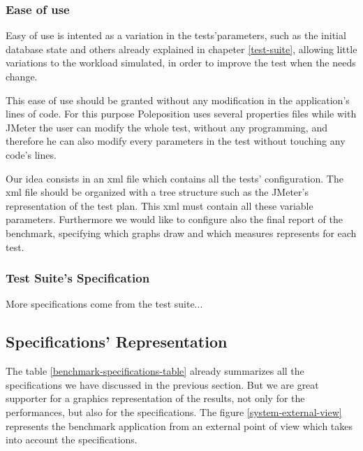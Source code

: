 			\subsubsection{Ease of use}
Easy of use is intented as a variation in the tests'parameters, such as the initial database state and others already explained in chapeter \ref{test-suite}, allowing little variations to the workload simulated, in order to improve the test when the needs change. 

This ease of use should be granted without any modification in the application's lines of code. For this purpose Poleposition uses several properties files while with JMeter the user can modify the whole test, without any programming, and therefore he can also modify every parameters in the test without touching any code's lines.

Our idea consists in an xml file which contains all the tests' configuration. The xml file should be organized with a tree structure such as the JMeter's representation of the test plan. This xml must contain all these variable parameters. Furthermore we would like to configure also the final report of the benchmark, specifying which graphs draw and which measures represents for each test.

			\subsubsection{Test Suite's Specification}
More specifications come from the test suite...
		
		
		\subsection{Specifications' Representation}
The table \ref{benchmark-specifications-table} already summarizes all the specifications we have discussed in the previous section. But we are great supporter for a graphics representation of the results, not only for the performances, but also for the specifications. The figure \ref{system-external-view} represents the benchmark application from an external point of view which takes into account the specifications. 
		
